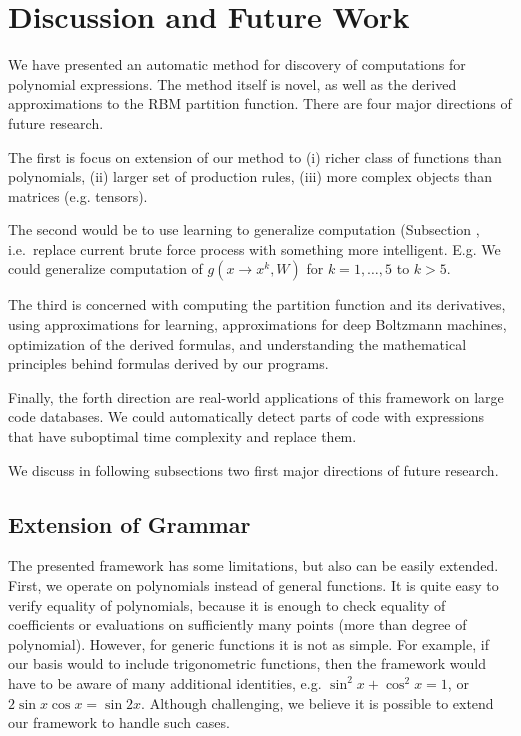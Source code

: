 \section{Discussion and Future Work}

We have presented an automatic method for discovery of computations for
 polynomial expressions. The method itself is novel, as well as the derived
approximations to the RBM partition function.  There are four
major directions of future research. 


The first is focus on extension of our method
to (i) richer class of functions than polynomials, (ii) larger set of production
rules, (iii) more complex objects than matrices (e.g. tensors).


The second would be to use learning to
generalize computation (Subsection \label{agenda)}, i.e.~replace current brute force process with
something more intelligent. E.g. We could generalize computation of
$g(x \rightarrow x^k, W)$ for $k = 1, \dots, 5$ to $k > 5$. 


The third is concerned with computing
the partition function and its derivatives, using approximations for
learning, approximations for deep Boltzmann machines, optimization of
the derived formulas, and understanding the mathematical principles behind
formulas derived by our programs. 


Finally,
the forth direction are real-world applications of this framework on
large code databases. We could automatically detect parts of code with
expressions that have suboptimal time complexity and replace them.


We discuss in following subsections two first major directions of future research.


\subsection{Extension of Grammar}
The presented framework has some limitations, but also can be easily extended. First,
we operate on polynomials instead of general functions. It is quite easy to verify
equality of polynomials, because it is enough to check equality of coefficients or
evaluations on sufficiently many points (more than degree of
polynomial). However, for generic functions
it is not as simple. For example, if our basis would to include trigonometric functions, then the
framework would have to be aware of many additional identities,
e.g. $\sin^2{x} + \cos^2{x} = 1$, or $2\sin x \cos x = \sin
2x$. Although challenging, we believe it is possible to extend our
framework to handle such cases. 

